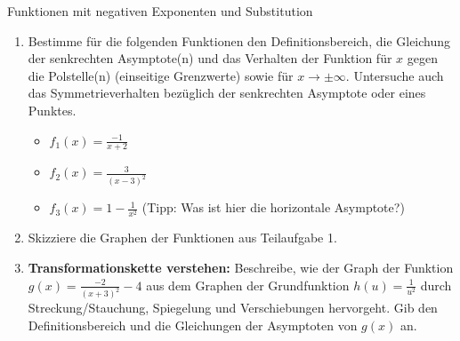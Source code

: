 \begin{aufgabenumgebung}{Funktionen mit negativen Exponenten und Substitution}
\begin{enumerate}
    \item Bestimme für die folgenden Funktionen den Definitionsbereich, die Gleichung der senkrechten Asymptote(n) und das Verhalten der Funktion für $x$ gegen die Polstelle(n) (einseitige Grenzwerte) sowie für $x \to \pm\infty$. Untersuche auch das Symmetrieverhalten bezüglich der senkrechten Asymptote oder eines Punktes.
        \begin{itemize}
            \item $f_1(x) = \frac{-1}{x+2}$
            \item $f_2(x) = \frac{3}{(x-3)^2}$
            \item $f_3(x) = 1 - \frac{1}{x^2}$ (Tipp: Was ist hier die horizontale Asymptote?)
        \end{itemize}
    \item Skizziere die Graphen der Funktionen aus Teilaufgabe 1.
    \item \textbf{Transformationskette verstehen:}
        Beschreibe, wie der Graph der Funktion $g(x) = \frac{-2}{(x+3)^2} - 4$ aus dem Graphen der Grundfunktion $h(u) = \frac{1}{u^2}$ durch Streckung/Stauchung, Spiegelung und Verschiebungen hervorgeht. Gib den Definitionsbereich und die Gleichungen der Asymptoten von $g(x)$ an.
\end{enumerate}
\end{aufgabenumgebung}

